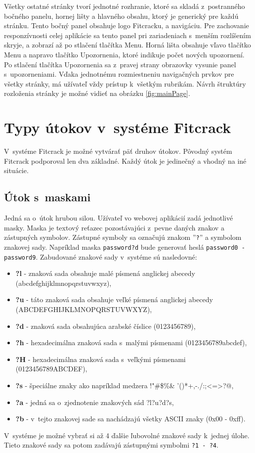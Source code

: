 \documentclass[slovak]{fitthesis}
\begin{document}
\noindent
Všetky ostatné stránky tvorí jednotné rozhranie, ktoré sa skladá z~postranného bočného panelu, hornej lišty a hlavného obsahu, ktorý je generický pre každú stránku. Tento bočný panel obsahuje logo Fitcracku, a navigáciu. Pre zachovanie responzívnosti celej aplikácie sa tento panel pri zariadeniach  s~menším rozlíšením skryje, a zobrazí až po stlačení tlačítka Menu. Horná lišta obsahuje vľavo tlačítko Menu a napravo tlačítko Upozornenia, ktoré indikuje počet nových upozornení. Po stlačení tlačítka Upozornenia sa z~pravej strany obrazovky vysunie panel s~upozorneniami. Vďaka jednotnému rozmiestneniu navigačných prvkov pre všetky stránky, má užívateľ vždy prístup k~všetkým rubrikám. Návrh štruktúry rozloženia stránky je možné vidieť na obrázku \ref{fig:mainPage}.


\section{Typy útokov v~systéme Fitcrack}
V~systéme Fitcrack je možné vytvárať päť druhov útokov. Pôvodný systém Fitcrack podporoval len dva základné. Každý útok je jedinečný a vhodný na iné situácie.


\subsection{Útok s~maskami} \label{maskAttack}
Jedná sa o~útok hrubou silou. Užívateľ  vo webovej aplikácií zadá jednotlivé masky. Maska je textový reťazec pozostávajúci z~pevne daných znakov a zástupných symbolov. Zástupné symboly sa označujú znakom ''\texttt{?}'' a symbolom znakovej sady. Napríklad maska \texttt{password?d} bude generovať heslá \texttt{password0 - password9}. Zabudované znakové sady v~systéme sú nasledovné:
\begin{itemize}
    \item \textbf{?l} - znaková sada obsahuje malé písmená anglickej abecedy (abcdefghijklmnopqrstuvwxyz),
    \item \textbf{?u} - táto znaková sada obsahuje veľké písmená anglickej abecedy (ABCDEFGHIJKLMNOPQRSTUVWXYZ),
    \item \textbf{?d} - znaková sada obsahujúca arabské číslice (0123456789),
    \item \textbf{?h} - hexadecimálna znaková sada s~malými písmenami (0123456789abcdef),
    \item \textbf{?H} - hexadecimálna znaková sada s~veľkými písmenami (0123456789ABCDEF),
    \item \textbf{?s} - špeciálne znaky ako napríklad medzera !"\#\$\%\&
    '()*+,-./:;<=>?@,
    \item \textbf{?a} - jedná sa o~zjednotenie znakových sád ?l?u?d?s,
    \item \textbf{?b} - v~tejto znakovej sade sa nachádzajú všetky ASCII znaky (0x00 - 0xff).
\end{itemize}
V~systéme je možné vybrať si až 4 ďalšie ľubovolné znakové sady k~jednej úlohe. Tieto znakové sady sa potom zadávajú zástupnými symbolmi \texttt{?1 - ?4}.
\end{document}
